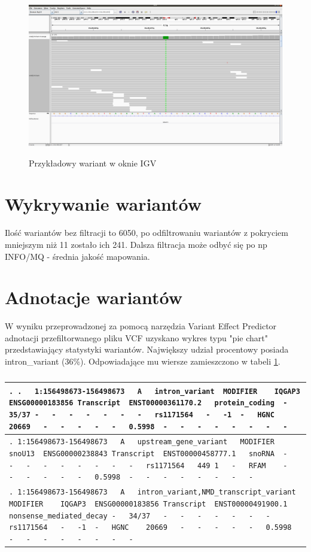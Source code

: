 \documentclass[a4paper]{article}
\begin{document}
\begin{figure}[h]
    \centering
    \includegraphics[width=1.0\textwidth]{vcf.png}
    \label{fig:igv}
    \caption[]{Przykładowy wariant w oknie IGV}
\end{figure}


\section{Wykrywanie wariantów}

Ilość wariantów bez filtracji to 6050, po odfiltrowaniu wariantów z pokryciem mniejszym niż 11 zostało ich 241. Dalsza filtracja może odbyć się po np INFO/MQ - średnia jakość mapowania.

\section{Adnotacje wariantów}
W wyniku przeprowadzonej za pomocą narzędzia Variant Effect Predictor adnotacji przefiltorwanego pliku VCF uzyskano wykres typu "pie chart" przedstawiający statystyki wariantów. Największy udział procentowy posiada intron\_variant (36\%). Odpowiadające mu wiersze zamieszczono w tabeli \ref{table:3lines}.

\begin{table}[H]
    \caption{
    \label{table:3lines}
    }
\begin{center}
\begin{tabular}{| p{150mm} |}

    \hline
    \verb|.	.	1:156498673-156498673	A	intron_variant	MODIFIER	IQGAP3	ENSG00000183856	Transcript	ENST00000361170.2	protein_coding	- 35/37	-	-	-	-	-	-	-	rs1171564	-	-1	-	HGNC	20669	-	-	-	-	-	0.5998	-	-	-	-	-	-	-	-|
    \\
    \hline
\verb|.	1:156498673-156498673	A	upstream_gene_variant	MODIFIER	snoU13	ENSG00000238843	Transcript	ENST00000458777.1	snoRNA	-	-	-	-	-	-	-	-	-	rs1171564	449	1	-	RFAM	-	-	-	-	-	-	0.5998	-	-	-	-	-	-	-	-|
    \\
    \hline
\verb|.	1:156498673-156498673	A	intron_variant,NMD_transcript_variant	MODIFIER	IQGAP3	ENSG00000183856	Transcript	ENST00000491900.1	nonsense_mediated_decay	-	34/37	-	-	-	-	-	-	-	rs1171564	-	-1	-	HGNC	20669	-	-	-	-	-	0.5998	-	-	-	-	-	-	-	-|
    \\
    \hline
\end{tabular}
\end{center}
\end{table}
\end{document}

